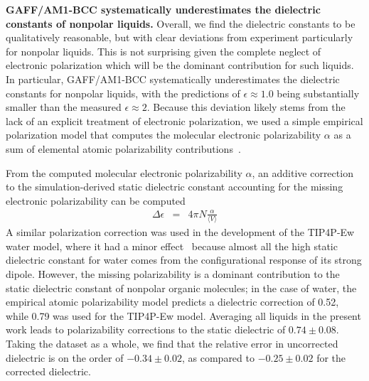 \documentclass[aps,pre,twocolumn,nofootinbib,superscriptaddress,linenumbers]{revtex4-1}
\begin{document}

{\bf GAFF/AM1-BCC systematically underestimates the dielectric constants of nonpolar liquids.}
Overall, we find the dielectric constants to be qualitatively reasonable, but with clear deviations from experiment particularly for nonpolar liquids. 
This is not surprising given the complete neglect of electronic polarization which will be the dominant contribution for such liquids.
In particular, GAFF/AM1-BCC systematically underestimates the dielectric constants for nonpolar liquids, with the predictions of $\epsilon \approx 1.0 $ being substantially smaller than the measured $\epsilon \approx 2$.  
Because this deviation likely stems from the lack of an explicit treatment of electronic polarization, we used a simple empirical polarization model that computes the molecular electronic polarizability $\alpha$ as a sum of elemental atomic polarizability contributions~\cite{bosque2002polarizabilities}.


From the computed molecular electronic polarizability $\alpha$, an additive correction to the simulation-derived static dielectric constant accounting for the missing electronic polarizability can be computed~\cite{horn2004}
\begin{eqnarray}
\Delta \epsilon &=& 4 \pi N  \frac{\alpha}{\langle V \rangle} \label{equation:dielectric correction}
\end{eqnarray}
A similar polarization correction was used in the development of the TIP4P-Ew water model, where it had a minor effect~\cite{horn2004} because almost all the high static dielectric constant for water comes from the configurational response of its strong dipole.  
However, the missing polarizability is a dominant contribution to the static dielectric constant of nonpolar organic molecules;   
in the case of water, the empirical atomic polarizability model predicts a dielectric correction of 0.52, while 0.79 was used for the TIP4P-Ew model.  
Averaging all liquids in the present work leads to polarizability corrections to the static dielectric of $0.74 \pm 0.08$.
Taking the dataset as a whole, we find that the relative error in uncorrected dielectric is on the order of $-0.34 \pm 0.02$, as compared to $-0.25 \pm 0.02$ for the corrected dielectric.
\end{document}
